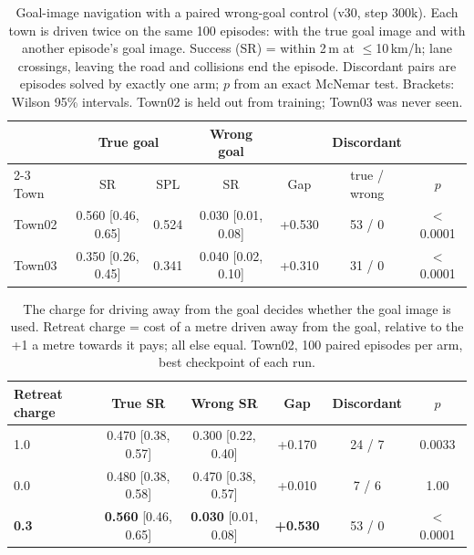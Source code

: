 
\begin{table}[t]
\centering
\caption{Goal-image navigation with a paired wrong-goal control (v30, step 300k).
Each town is driven twice on the same 100 episodes: with the true goal image and
with another episode's goal image. Success (SR) = within 2\,m at $\leq$10\,km/h;
lane crossings, leaving the road and collisions end the episode. Discordant
pairs are episodes solved by exactly one arm; $p$ from an exact McNemar test.
Brackets: Wilson 95\% intervals. Town02 is held out from training; Town03 was
never seen.}
\label{tab:main}
\begin{tabular}{lcccccc}
\toprule
 & \multicolumn{2}{c}{True goal} & Wrong goal & & Discordant & \\
\cmidrule(lr){2-3}
Town & SR & SPL & SR & Gap & true / wrong & $p$ \\
\midrule
Town02 & 0.560 \tiny[0.46, 0.65] & 0.524 & 0.030 \tiny[0.01, 0.08] & +0.530 & 53 / 0 & $<$0.0001 \\
Town03 & 0.350 \tiny[0.26, 0.45] & 0.341 & 0.040 \tiny[0.02, 0.10] & +0.310 & 31 / 0 & $<$0.0001 \\
\bottomrule
\end{tabular}
\end{table}

\begin{table}[t]
\centering
\caption{The charge for driving away from the goal decides whether the goal image
is used. Retreat charge = cost of a metre driven away from the goal, relative to
the +1 a metre towards it pays; all else equal. Town02, 100 paired episodes per
arm, best checkpoint of each run.}
\label{tab:retreat}
\begin{tabular}{lccccc}
\toprule
Retreat charge & True SR & Wrong SR & Gap & Discordant & $p$ \\
\midrule
1.0 & 0.470 \tiny[0.38, 0.57] & 0.300 \tiny[0.22, 0.40] & +0.170 & 24 / 7 & 0.0033 \\
0.0 & 0.480 \tiny[0.38, 0.58] & 0.470 \tiny[0.38, 0.57] & +0.010 & 7 / 6 & 1.00 \\
\textbf{0.3} & \textbf{0.560} \tiny[0.46, 0.65] & \textbf{0.030} \tiny[0.01, 0.08] & \textbf{+0.530} & 53 / 0 & $<$0.0001 \\
\bottomrule
\end{tabular}
\end{table}

